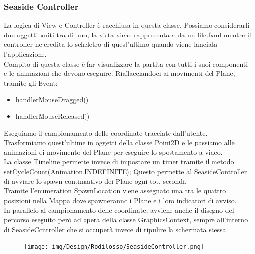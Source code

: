 \documentclass[a4paper,12pt]{report}
\begin{document}
\subsubsection{Seaside Controller}
La logica di View e Controller è racchiusa in questa classe, 
Possiamo considerarli due oggetti uniti tra di loro, la vista viene rappresentata da un file.fxml mentre il controller ne eredita lo 
scheletro di quest’ultimo quando viene lanciata l’applicazione.
\\
Compito di questa classe è far visualizzare la partita con tutti i suoi componenti e le animazioni che devono eseguire.
Riallacciandoci ai movimenti del Plane, tramite gli Event:
\begin{itemize}
    \item handlerMouseDragged()
    \item handlerMouseReleased()
\end{itemize}

\noindent Eseguiamo il campionamento delle coordinate tracciate dall’utente.
\\
Trasformiamo quest’ultime in oggetti della classe Point2D e le passiamo alle animazioni di movimento del Plane per eseguire lo spostamento a 
video.
\\
La classe Timeline permette invece di impostare un timer tramite il metodo setCycleCount(Animation.INDEFINITE);
Questo permette al SeasideController di avviare lo spawn continuativo dei Plane ogni tot. secondi.
\\
Tramite l’enumeration SpawnLocation viene assegnato una tra le quattro posizioni nella Mappa dove spawneranno i Plane e i loro indicatori di 
avviso.
\\
In parallelo al campionamento delle coordinate, avviene anche il disegno del percorso eseguito però ad opera della classe GraphicsContext,
sempre all’interno di SeasideController che si occuperà invece di ripulire la schermata stessa.
\begin{figure}[H]
    \begin{center}
        \centering
        \texttt{[image: img/Design/Rodilosso/SeasideController.png]}
    \end{center}
    \label{img:seaside-controller}
\end{figure}
\end{document}

